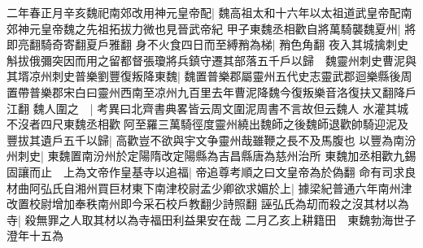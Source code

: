 二年春正月辛亥魏祀南郊改用神元皇帝配|{
	魏高祖太和十六年以太祖道武皇帝配南郊神元皇帝魏之先祖拓拔力微也見晉武帝紀}
甲子東魏丞相歡自將萬騎襲魏夏州|{
	將即亮翻騎奇寄翻夏戶雅翻}
身不火食四日而至縛矟為梯|{
	矟色角翻}
夜入其城擒刺史斛拔俄彌突因而用之留都督張瓊將兵鎮守遷其部落五千戶以歸　魏靈州刺史曹泥與其壻凉州刺史普樂劉豐復叛降東魏|{
	魏置普樂郡屬靈州五代史志靈武郡迴樂縣後周置帶普樂郡宋白曰靈州西南至凉州九百里去年曹泥降魏今復叛樂音洛復扶又翻降戶江翻}
魏人圍之　|{
	考異曰北齊書典畧皆云周文圍泥周書不言故但云魏人}
水灌其城不沒者四尺東魏丞相歡阿至羅三萬騎徑度靈州繞出魏師之後魏師退歡帥騎迎泥及豐拔其遺戶五千以歸|{
	高歡豈不欲與宇文争靈州哉雖鞭之長不及馬腹也}
以豐為南汾州刺史|{
	東魏置南汾州於定陽隋改定陽縣為吉昌縣唐為慈州治所}
東魏加丞相歡九錫固讓而止　上為文帝作皇基寺以追福|{
	帝追尊考順之曰文皇帝為於偽翻}
命有司求良材曲阿弘氏自湘州買巨材東下南津校尉孟少卿欲求媚於上|{
	據梁紀普通六年南州津改置校尉增加奉秩南州即今采石校戶教翻少詩照翻}
誣弘氏為刧而殺之沒其材以為寺|{
	殺無罪之人取其材以為寺福田利益果安在哉}
二月乙亥上耕籍田　東魏勃海世子澄年十五為

